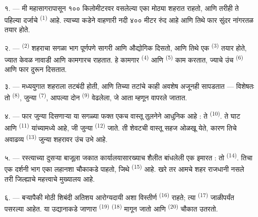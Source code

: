 \VUsaut{2.0mm}
\VUsaut{3.0mm}
\VUfilet{16mm}
\VUsaut{5.6mm}
\VUsaut{1.4mm}
\VUsaut{2.2mm}

\VUsaut{3.0mm}

१. --- मी महासागरापासून १०० किलोमीटरवर वसलेल्या एका मोठ्या शहरात राहतो, आणि तरीही ते पहिल्या
दर्जाचे  \textsuperscript{(1)} आहे. त्याच्या कडेने वाहणारी नदी ४०० मीटर रुंद आहे
आणि तिथे फार सुंदर नांगरतळ तयार होते.

२. ---  \textsuperscript{(2)} शहराचा सगळा भाग पूर्णपणे सागरी आणि औद्योगिक
दिसतो, आणि तिथे एक  \textsuperscript{(3)} तयार होते, ज्यात केवळ नावाडी आणि
कामगारच राहतात. हे कामगार  \textsuperscript{(4)} आणि
 \textsuperscript{(5)} काम करतात, ज्याचे उंच 
\textsuperscript{(6)} आणि  फार दुरून दिसतात.

३. --- मध्ययुगात शहराला तटबंदी होती, आणि तिच्या तटांचे काही अवशेष अजूनही सापडतात — विशेषतः तो
 \textsuperscript{(8)}, जुन्या 
\textsuperscript{(7)}, आपल्या दोन  \textsuperscript{(9)} वेढलेला, जे आता
 म्हणून वापरले जातात.

४. --- फार जुन्या दिसणाऱ्या या सगळ्या  फक्त एकच वास्तू तुलनेने आधुनिक आहे : ते
 \textsuperscript{(10)}. ते घाट आणि 
\textsuperscript{(11)} यांच्यामध्ये आहे, जी जुन्या  \textsuperscript{(12)}
जाते. ती शेवटची वास्तू सहज ओळखू येते, कारण तिचे अवाढव्य  \textsuperscript{(13)}
जुन्या शहरावर उंच उभे आहे.

५. --- रस्त्याच्या दुसऱ्या बाजूला जकात कार्यालयासारख्याच शैलीत बांधलेली एक इमारत
 : तो  \textsuperscript{(14)}. तिचा एक दर्शनी भाग एका लहानशा
चौकाकडे पाहतो, जिथे  \textsuperscript{(15)} आहे. खरे तर
आमचे शहर राजधानी नसले तरी जिल्ह्याचे महत्त्वाचे मुख्यालय आहे.

\VUsaut{5.0mm}
\VUsaut{3.4mm}

६. --- बऱ्यापैकी मोठी शिबंदी अतिशय आरोग्यदायी अशा विस्तीर्ण 
\textsuperscript{(16)} राहते; त्या  \textsuperscript{(17)} जाळीपर्यंत
पसरल्या आहेत. या उद्यानाकडे जाणारा  \textsuperscript{(19)}
 \textsuperscript{(18)} मागून जातो आणि 
\textsuperscript{(20)} चौकात उतरतो.

